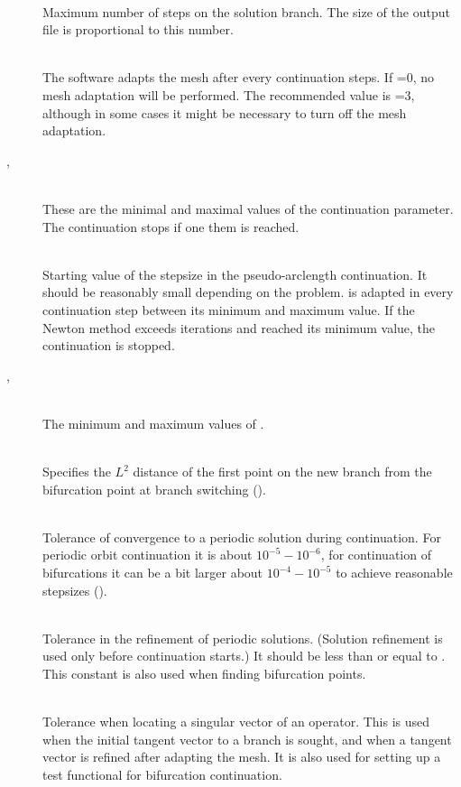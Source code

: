 \documentclass[10pt,a4paper]{ddedoc}
\begin{document}
\begin{description}
%
\item[] ~\\
Maximum number of steps on the solution branch. The size of the output file is proportional to this number.
%
\item[] ~\\
The software adapts the mesh after every  continuation steps.
If =0, no mesh adaptation will be performed. The recommended value is =3,
although in some cases it might be necessary to turn off the mesh adaptation.
%
\item[, ] ~\\
These are the minimal and maximal values of the continuation parameter. The continuation stops if one them is reached.
%
\item[] ~\\
Starting value of the stepsize in the pseudo-arclength continuation.
It should be reasonably small depending on the problem.  is adapted in
every continuation step between its minimum and maximum value. If the Newton
method exceeds  iterations and  reached its minimum value,
the continuation is stopped.
%
\item[, ] ~\\
The minimum and maximum values of .
%
\item[] ~\\
Specifies the $L^2$ distance of the first point on the new branch from the bifurcation 
point at branch switching ().
%
\item[] ~\\
Tolerance of convergence to a periodic solution during continuation. For
periodic orbit continuation it is about $10^{-5} - 10^{-6}$, for continuation of
bifurcations it can be a bit larger about $10^{-4} - 10^{-5}$ to achieve
reasonable stepsizes ().
%
\item[] ~\\
Tolerance in the refinement of periodic solutions. (Solution refinement is used
only before continuation starts.) It should be less than or equal to
. This constant is also used when finding bifurcation points.
%
\item[] ~\\
Tolerance when locating a singular vector of an operator. This is used when the initial tangent vector to a branch is sought,
and when a tangent vector is refined after adapting the mesh. It is also used for setting up a test functional for bifurcation continuation.

\end{description}
\end{document}
